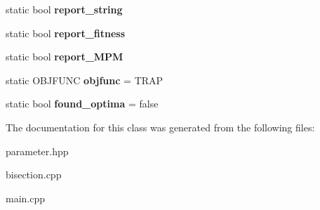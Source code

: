 \begin{DoxyCompactItemize}
\item 
\hypertarget{classparameter_a721cf621238e3ac81b4417f7ccef0b98}{static bool {\bfseries report\-\_\-string}}\label{classparameter_a721cf621238e3ac81b4417f7ccef0b98}

\item 
\hypertarget{classparameter_a965f5b72483793a4efcc27fa63957063}{static bool {\bfseries report\-\_\-fitness}}\label{classparameter_a965f5b72483793a4efcc27fa63957063}

\item 
\hypertarget{classparameter_a48aac975faaa06d080190dd12949b45c}{static bool {\bfseries report\-\_\-\-M\-P\-M}}\label{classparameter_a48aac975faaa06d080190dd12949b45c}

\item 
\hypertarget{classparameter_a6514a721897d88164cd5a935c8b98bbe}{static \-O\-B\-J\-F\-U\-N\-C {\bfseries objfunc} = \-T\-R\-A\-P}\label{classparameter_a6514a721897d88164cd5a935c8b98bbe}

\item 
\hypertarget{classparameter_a215914f7e21cdce69f9d428570a7b703}{static bool {\bfseries found\-\_\-optima} = false}\label{classparameter_a215914f7e21cdce69f9d428570a7b703}

\end{DoxyCompactItemize}


\-The documentation for this class was generated from the following files\-:\begin{DoxyCompactItemize}
\item 
parameter.\-hpp\item 
bisection.\-cpp\item 
main.\-cpp\end{DoxyCompactItemize}
